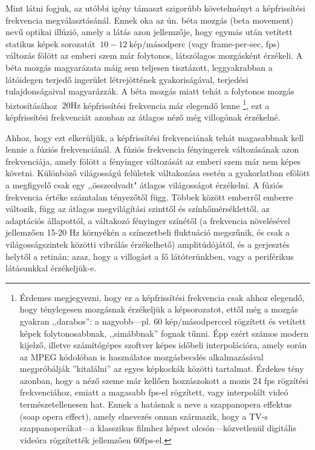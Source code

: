 Mint látni fogjuk, az utóbbi igény támaszt szigorúbb követelményt a képfrissítési frekvencia megválasztásánál.
Ennek oka az ún. béta mozgás (beta movement) nevű optikai illúzió, amely a látás azon jellemzője, hogy egymás után vetített statikus képek sorozatát $~10-12~\mathrm{kép/másodperc}$ (vagy frame-per-sec, fps) változás fölött az emberi szem már folytonos, látszólagos mozgásként érzékeli.
A béta mozgás magyarázata máig sem teljesen tisztázott, leggyakrabban a látóidegen terjedő ingerület létrejöttének gyakoriságával, terjedési tulajdonságaival magyarázzák.
A béta mozgás miatt tehát a folytonos mozgás biztosításához $~20 \mathrm{Hz}$ képfrissítési frekvencia már elegendő lenne 
\footnote{Érdemes megjegyezni, hogy ez a képfrissítési frekvencia csak ahhoz elegendő, hogy ténylegesen mozgásnak érzékeljük a képsorozatot, ettől még a mozgás gyakran ,,darabos'': a nagyobb---pl. 60 kép/másodperccel rögzített és vetített képek folytonosabbnak, ,,simábbnak'' fognak tűnni. 
Épp ezért számos modern kijelző, illetve számítógépes szoftver képes időbeli interpolációra, amely során az MPEG kódolóban is használatos mozgásbecslés alkalmazásával megpróbálják ''kitalálni'' az egyes képkockák közötti tartalmat.
Érdekes tény azonban, hogy a néző szeme már kellően hozzászokott a mozis 24 fps rögzítési frekvenciához, emiatt a magasabb fps-el rögzített, vagy interpolált videó természetellenesen hat.
Ennek a hatásnak a neve a szappanopera effektus (soap opera effect), amely elnevezés onnan származik, hogy a TV-s szappanoperákat---a klasszikus filmhez képest olcsón---közvetlenül digitális videóra rögzítették jellemzően $60 \mathrm{fps}$-el.},
ezt a képfrissítési frekvenciát azonban az átlagos néző még villogónak érzékelné.

Ahhoz, hogy ezt elkerüljük, a képfrissítési frekvenciának tehát magasabbnak kell lennie a fúziós frekvenciánál.
A fúziós frekvencia fényingerek változásának azon frekvenciája, amely fölött a fényinger változását az emberi szem már nem képes követni.
Különböző világosságú felületek váltakozása esetén a gyakorlatban efölött a megfigyelő csak egy ,,összeolvadt" átlagos világosságot érzékelni.
A fúziós frekvencia értéke számtalan tényezőtől függ. 
Többek között emberről emberre változik, függ az átlagos megvilágítási szinttől és színhőmérséklettől, az adaptációs állapottól, a váltakozó fényinger színétől (a frekvencia növelésével jellemzően 15-20 Hz környékén a színezetbeli fluktuáció megszűnik, és csak a világosságszintek közötti vibrálás érzékelhető) amplitúdójától, és a gerjesztés helytől a retinán: azaz, hogy a villogást a fő látóterünkben, vagy a periférikus látásunkkal érzékeljük-e.

